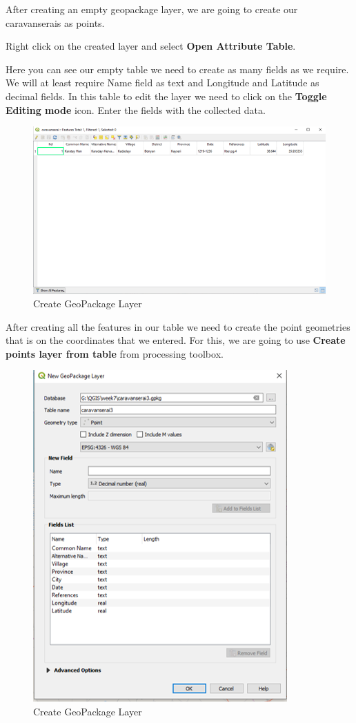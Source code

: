 \documentclass[
]{book}
\begin{document}
After creating an empty geopackage layer, we are going to create our caravanserais as points.

Right click on the created layer and select \textbf{Open Attribute Table}.

Here you can see our empty table we need to create as many fields as we require. We will at least require Name field as text and Longitude and Latitude as decimal fields. In this table to edit the layer we need to click on the \textbf{Toggle Editing mode} icon. Enter the fields with the collected data.

\begin{figure}
\centering
\includegraphics{Images/caravanseraiTable.png}
\caption{Create GeoPackage Layer}
\end{figure}

After creating all the features in our table we need to create the point geometries that is on the coordinates that we entered. For this, we are going to use \textbf{Create points layer from table} from processing toolbox.

\begin{figure}
\centering
\includegraphics{Images/geopackage.png}
\caption{Create GeoPackage Layer}
\end{figure}
\end{document}

